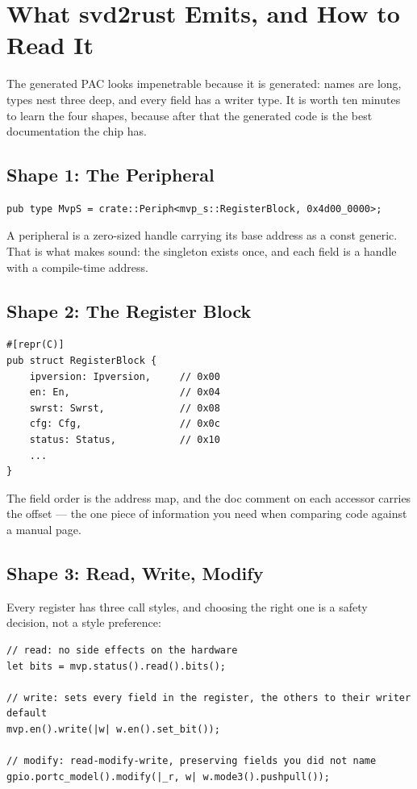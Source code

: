 \section{What svd2rust Emits, and How to Read It}
\label{sec:svd2rust-emits}

The generated PAC looks impenetrable because it is generated: names are long, types nest three deep,
and every field has a writer type. It is worth ten minutes to learn the four shapes, because after
that the generated code is the best documentation the chip has.

\subsection{Shape 1: The Peripheral}

\begin{verbatim}
pub type MvpS = crate::Periph<mvp_s::RegisterBlock, 0x4d00_0000>;
\end{verbatim}

A peripheral is a zero-sized handle carrying its base address as a const generic. That is what makes
 sound: the singleton exists once, and each field is a handle with a
compile-time address.

\subsection{Shape 2: The Register Block}

\begin{verbatim}
#[repr(C)]
pub struct RegisterBlock {
    ipversion: Ipversion,     // 0x00
    en: En,                   // 0x04
    swrst: Swrst,             // 0x08
    cfg: Cfg,                 // 0x0c
    status: Status,           // 0x10
    ...
}
\end{verbatim}

The field order is the address map, and the doc comment on each accessor carries the offset — the one
piece of information you need when comparing code against a manual page.

\subsection{Shape 3: Read, Write, Modify}

Every register has three call styles, and choosing the right one is a safety decision, not a style
preference:

\begin{verbatim}
// read: no side effects on the hardware
let bits = mvp.status().read().bits();

// write: sets every field in the register, the others to their writer default
mvp.en().write(|w| w.en().set_bit());

// modify: read-modify-write, preserving fields you did not name
gpio.portc_model().modify(|_r, w| w.mode3().pushpull());
\end{verbatim}

